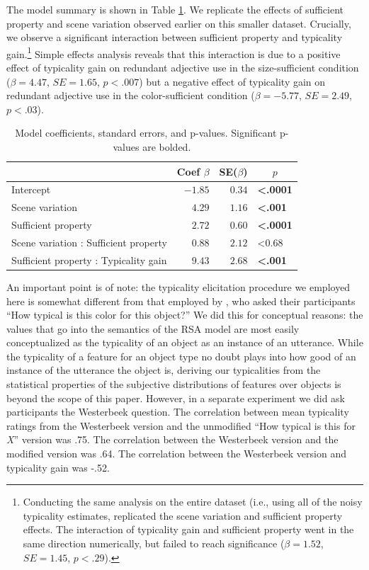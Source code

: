\documentclass[11pt]{article}
\newcommand{\tableref}[1]{Table \ref{#1}}
\begin{document}
The model summary is shown in \tableref{tab:colortypicalityresults}. We replicate the effects of sufficient property and scene variation observed earlier on this smaller dataset. Crucially, we observe a significant interaction between sufficient property and typicality gain.\footnote{Conducting the same analysis on the entire dataset (i.e., using all of the noisy typicality estimates, replicated the scene variation and sufficient property effects. The interaction of typicality gain and sufficient property went in the same direction numerically, but failed to reach significance ($\beta = 1.52$, $SE = 1.45$, $p < .29$).} Simple effects analysis reveals that this interaction is due to a positive effect of typicality gain on redundant adjective use in the size-sufficient condition ($\beta = 4.47$, $SE = 1.65$, $p < .007$) but a negative effect of typicality gain on redundant adjective use in the color-sufficient condition  ($\beta = -5.77$, $SE = 2.49$, $p < .03$). 

\begin{table}[!tbp]
\caption{Model coefficients, standard errors, and p-values. Significant p-values are bolded.}
\begin{center}
\begin{tabular}{lrrl}
\toprule
\multicolumn{1}{l}{}&\multicolumn{1}{c}{Coef $\beta$}&\multicolumn{1}{c}{SE($\beta$)}&\multicolumn{1}{c}{$p$}\tabularnewline
\midrule
Intercept&$-1.85$&$0.34$&\textbf{\textless .0001}\tabularnewline
Scene variation&$ 4.29$&$1.16$&\textbf{\textless .001}\tabularnewline
Sufficient property&$ 2.72$&$0.60$&\textbf{\textless .0001}\tabularnewline
Scene variation : Sufficient property&$ 0.88$&$2.12$&\textless 0.68\tabularnewline
Sufficient property : Typicality gain&$ 9.43$&$2.68$&\textbf{\textless .001}\tabularnewline
\bottomrule
\end{tabular}\end{center}
\label{tab:colortypicalityresults}
\end{table}

An important point is of note: the typicality elicitation procedure we employed here is somewhat different from that employed by , who asked their participants ``How typical is this color for this object?'' We did this for conceptual reasons: the values that go into the semantics of the RSA model are most easily conceptualized as the typicality of an object as an instance of an utterance. While the typicality of a feature for an object type no doubt plays into how good of an instance of the utterance the object is, deriving our typicalities from the  statistical properties of the subjective distributions of features over objects is beyond the scope of this paper. However, in a separate experiment we did ask participants the Westerbeek question. The correlation between mean typicality ratings from the Westerbeek version and the unmodified ``How typical is this for \emph{X}'' version was .75. The correlation between the Westerbeek version and the modified version was .64. The correlation between the Westerbeek version and typicality gain was -.52.
\end{document}
